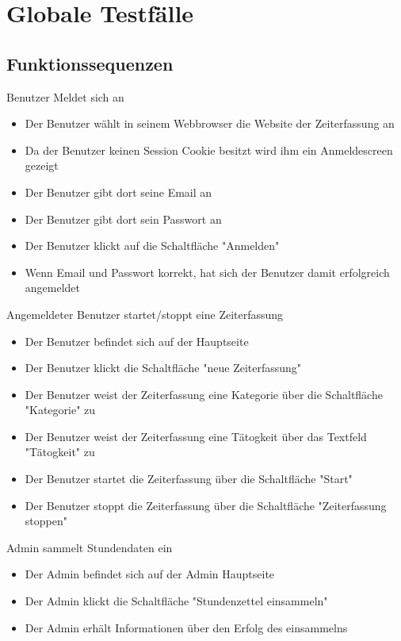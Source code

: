 \section{Globale Testfälle}

\subsection{Funktionssequenzen}
\begin{requirements}
	 Benutzer Meldet sich an
	\begin{itemize}
  			\item Der Benutzer wählt in seinem Webbrowser die Website der Zeiterfassung an
  			\item Da der Benutzer keinen Session Cookie besitzt wird ihm ein Anmeldescreen gezeigt
  			\item Der Benutzer gibt dort seine Email an
  			\item Der Benutzer gibt dort sein Passwort an
  			\item Der Benutzer klickt auf die Schaltfläche "Anmelden"
  			\item Wenn Email und Passwort korrekt, hat sich der Benutzer damit erfolgreich angemeldet
	\end{itemize}
	 Angemeldeter Benutzer startet/stoppt eine Zeiterfassung
	\begin{itemize}
		\item Der Benutzer befindet sich auf der Hauptseite
		\item Der Benutzer klickt die Schaltfläche "neue Zeiterfassung"
		\item Der Benutzer weist der Zeiterfassung eine Kategorie über die Schaltfläche "Kategorie" zu
		\item Der Benutzer weist der Zeiterfassung eine Tätogkeit über das Textfeld "Tätogkeit" zu
		\item Der Benutzer startet die Zeiterfassung über die Schaltfläche "Start"
		\item Der Benutzer stoppt die Zeiterfassung über die Schaltfläche "Zeiterfassung stoppen"
	\end {itemize}
	 Admin sammelt Stundendaten ein
	\begin{itemize}
		\item Der Admin befindet sich auf der Admin Hauptseite
		\item Der Admin klickt die Schaltfläche "Stundenzettel einsammeln"
		\item Der Admin erhält Informationen über den Erfolg des einsammelns

\end{itemize}
\end{requirements}
